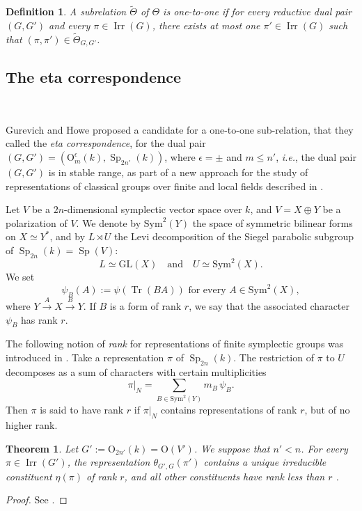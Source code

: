 \documentclass[12pt]{amsart}
\numberwithin{equation}{subsection}
\newtheorem{defn}[equation]{Definition}
\newtheorem{thm}[equation]{Theorem}
\newcommand{\Tr}{\operatorname{Tr}}
\newcommand{\Irr}{\operatorname{Irr}}
\newcommand{\GL}{\mathrm{GL}}
\newcommand{\Sp}{\operatorname{Sp}}
\def\Sym{{\mathrm{Sym}}}
\def\rO{{\mathrm{O}}}
\begin{document}
\begin{defn} {\rm 
A subrelation $\widetilde{\Theta}$ of $\Theta$ is \textit{one-to-one} if for every reductive dual pair $(G,G')$ and every $\pi\in\Irr(G)$, there exists at most one $\pi'\in\Irr(G)$  
such that $(\pi,\pi')\in\widetilde{\Theta}_{G,G'}$.}
\end{defn}

\subsection{The eta correspondence}\

Gurevich and Howe  proposed a candidate for a one-to-one sub-relation,  that they called the \textit{eta correspondence},  for  the dual pair $(G,G')=(\rO^\epsilon_m(k),\Sp_{2n'}(k))$, 
where $\epsilon=\pm$ and $m\le n'$, \textit{i.e.}, the dual pair $(G,G')$ is in stable range, as part of a new approach for the study of
representations of classical groups over finite and local fields described in \cite{How-rank,GH,GH2,How2}. 

Let $V$ be a $2n$-dimensional symplectic vector space over $k$, and  $V=X\oplus Y$ be a polarization of $V$. 
We denote by $\Sym^2(Y)$ the space of symmetric bilinear forms on $X\simeq Y^*$, and by $L\rtimes U$ the Levi decomposition of the Siegel parabolic subgroup of  $\Sp_{2n}(k)=\Sp(V)$:
\[L\simeq \GL(X) \quad\text{and}\quad U\simeq\Sym^2(X).\]
We set
\[\text{$\psi_B(A):=\psi(\Tr(BA))$ for every $A\in\Sym^2(X)$},\]
where $Y\overset{A}{\to} X\overset{B}{\to}Y$.
If $B$ is a form of rank $r$,  we  say that the associated character $\psi_B$ has rank $r$.

The following notion of \textit{rank}  for representations  of finite symplectic groups was introduced in \cite{GH}.
Take a representation $\pi$ of $\Sp_{2n}(k)$. The  restriction  of $\pi$ to $U$ decomposes
as a sum of characters with certain multiplicities
\[ \pi|_{N}=\sum_{B\in\Sym^2(Y)} m_B\,\psi_B.\]
Then  $\pi$ is  said to have rank $r$ if $\pi|_{N}$ contains representations of rank $r$, but of no higher rank.


\begin{thm} 
Let $G':=\rO_{2n'}(k)=\rO(V')$. 
We suppose that $n'<n$. 
\textit{
For every $\pi\in\Irr(G')$, the representation $\theta_{G',G}(\pi')$ contains a unique
irreducible constituent $\eta(\pi)$
of rank $r$, and all other constituents have rank less
than $r$
}.
\end{thm}
\begin{proof}
See \cite[Theorem~3.3.3]{GH}.
\end{proof}
\end{document}

